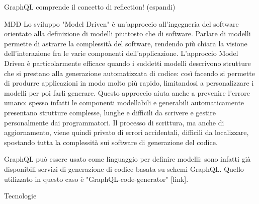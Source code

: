         GraphQL comprende il concetto di reflection! (espandi)

    MDD
        Lo sviluppo "Model Driven" è un'approccio all'ingegneria del software orientato alla definizione di modelli piuttosto che di software.
        Parlare di modelli permette di astrarre la complessità del software, rendendo più chiara la visione dell'interazione fra le varie componenti dell'applicazione.
        L'approccio Model Driven è particolarmente efficace quando i suddetti modelli descrivono strutture che si prestano alla generazione automatizzata di codice: così facendo si permette di produrre applicazioni in modo molto più rapido, limitandosi a personalizzare
        i modelli per poi farli generare.
        Questo approccio aiuta anche a prevenire l'errore umano: spesso infatti le componenti modellabili e generabili automaticamente presentano strutture complesse, lunghe e difficili da scrivere e gestire personalmente dai programmatori.
        Il processo di scrittura, ma anche di aggiornamento, viene quindi privato di errori accidentali, difficili da localizzare, spostando tutta la complessità sui software di generazione del codice.

        GraphQL può essere usato come linguaggio per definire modelli: sono infatti già disponibili servizi di generazione di codice basata su schemi GraphQL.
        Quello utilizzato in questo caso è "GraphQL-code-generator" [link].

Tecnologie

